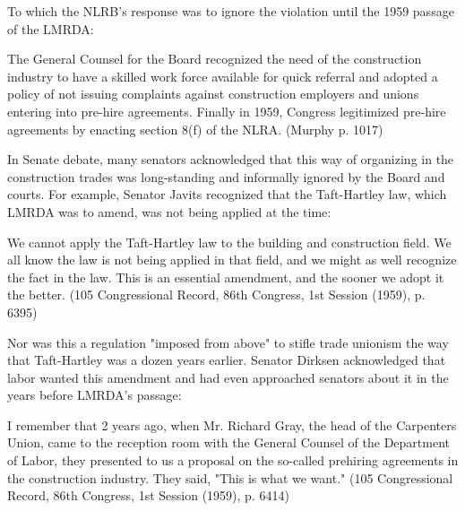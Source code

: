 \documentclass[12pt]{article}
\renewenvironment{quote}
  {\list{}{\leftmargin=\parindent\rightmargin=0pt}%
   \item\relax}
  {\endlist}
\begin{document}
To which the NLRB’s response was to ignore the violation until the 1959 passage of the LMRDA:

\begin{quote}
The General Counsel for the Board recognized the need of the construction industry to have a skilled work force available for quick referral and adopted a policy of not issuing complaints against construction employers and unions entering into pre-hire agreements. Finally in 1959, Congress legitimized pre-hire agreements by enacting section 8(f) of the NLRA. (Murphy p. 1017)
\end{quote}

In Senate debate, many senators acknowledged that this way of organizing in the construction trades was long-standing and informally ignored by the Board and courts. For example, Senator Javits recognized that the Taft-Hartley law, which LMRDA was to amend, was not being applied at the time:

\begin{quote}
We cannot apply the Taft-Hartley law to the building and construction field. We all know the law is not being applied in that field, and we might as well recognize the fact in the law. This is an essential amendment, and the sooner we adopt it the better. (105 Congressional Record, 86th Congress, 1st Session (1959), p. 6395) 
\end{quote}

Nor was this a regulation "imposed from above" to stifle trade unionism the way that Taft-Hartley was a dozen years earlier. Senator Dirksen acknowledged that labor wanted this amendment and had even approached senators about it in the years before LMRDA’s passage:

\begin{quote}
I remember that 2 years ago, when Mr. Richard Gray, the head of the Carpenters Union, came to the reception room with the General Counsel of the Department of Labor, they presented to us a proposal on the so-called prehiring agreements in the construction industry. They said, "This is what we want." (105 Congressional Record, 86th Congress, 1st Session (1959), p. 6414)
\end{quote}

\end{document}
